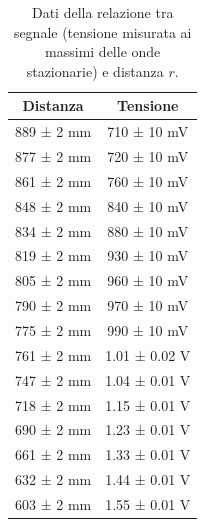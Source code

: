 \documentclass[a4paper]{article}
\begin{document}
\begin{table}[htbp]
\centering
\begin{tabular}{|c|c|}
\hline
Distanza & Tensione \\\hline\hline
889 ± 2 mm & 710 ± 10 mV \\
877 ± 2 mm & 720 ± 10 mV \\
861 ± 2 mm & 760 ± 10 mV \\
848 ± 2 mm & 840 ± 10 mV \\
834 ± 2 mm & 880 ± 10 mV \\
819 ± 2 mm & 930 ± 10 mV \\
805 ± 2 mm & 960 ± 10 mV \\
790 ± 2 mm & 970 ± 10 mV \\
775 ± 2 mm & 990 ± 10 mV \\
761 ± 2 mm & 1.01 ± 0.02 V \\
747 ± 2 mm & 1.04 ± 0.01 V \\
718 ± 2 mm & 1.15 ± 0.01 V \\
690 ± 2 mm & 1.23 ± 0.01 V \\
661 ± 2 mm & 1.33 ± 0.01 V \\
632 ± 2 mm & 1.44 ± 0.01 V \\
603 ± 2 mm & 1.55 ± 0.01 V \\
\hline
\end{tabular}
\caption{Dati della relazione tra segnale (tensione misurata ai massimi delle onde stazionarie) e distanza $r$.}
\label{tab:dati_ampgeom_massimi_distanza}
\end{table}
\end{document}
